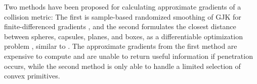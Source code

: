 Two methods have been proposed for calculating approximate gradients of a collision metric: The first is sample-based randomized smoothing of GJK for finite-differenced gradients \cite{montaut2022a}, and the second formulates the closest distance between spheres, capsules, planes, and boxes, as a differentiable optimization problem \cite{zimmermann2022}, similar to \cite{tracy2022}.  The approximate gradients from the first method are expensive to compute and are unable to return useful information if penetration occurs, while the second method is only able to handle a limited selection of convex primitives.

